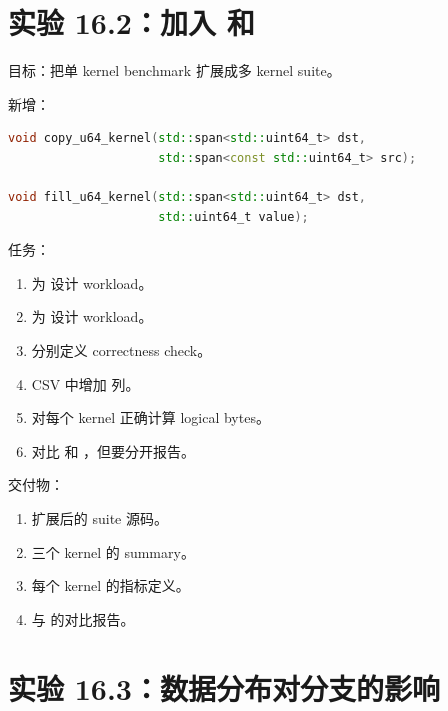 \section{实验 16.2：加入  和 }

\begin{labbox}
目标：把单 kernel benchmark 扩展成多 kernel suite。

新增：

\begin{lstlisting}[language=C++]
void copy_u64_kernel(std::span<std::uint64_t> dst,
                     std::span<const std::uint64_t> src);

void fill_u64_kernel(std::span<std::uint64_t> dst,
                     std::uint64_t value);
\end{lstlisting}

任务：

\begin{enumerate}
  \item 为  设计 workload。
  \item 为  设计 workload。
  \item 分别定义 correctness check。
  \item CSV 中增加  列。
  \item 对每个 kernel 正确计算 logical bytes。
  \item 对比  和 ，但要分开报告。
\end{enumerate}

交付物：

\begin{enumerate}
  \item 扩展后的 suite 源码。
  \item 三个 kernel 的 summary。
  \item 每个 kernel 的指标定义。
  \item {} 与  的对比报告。
\end{enumerate}
\end{labbox}

\section{实验 16.3：数据分布对分支的影响}

